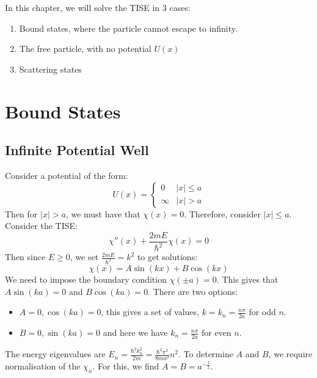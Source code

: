 \documentclass[../Main.tex]{subfiles}
\begin{document}
In this chapter, we will solve the TISE in 3 cases:
\begin{enumerate}
    \item Bound states, where the particle cannot escape to infinity.
    \item The free particle, with no potential $U(x)$
    \item Scattering states
\end{enumerate}
\section{Bound States}
\subsection{Infinite Potential Well}
Consider a potential of the form:
\begin{equation*}
    U(x) =
    \begin{cases}
        0 & |x| \leq a \\
        \infty & |x| > a
    \end{cases}
\end{equation*}
Then for $|x| > a$, we must have that $\chi(x) = 0$. Therefore, consider $|x| \leq a$. Consider the TISE:
\begin{equation*}
    \chi''(x) + \frac{2mE}{\hbar^2} \chi(x) = 0
\end{equation*}
Then since $E \geq 0$, we set $\frac{2mE}{\hbar^2} = k^2$ to get solutions:
\begin{equation*}
    \chi(x) = A\sin(kx) + B\cos(kx)
\end{equation*}
We need to impose the boundary condition $\chi(\pm a) = 0$. This gives that $A\sin(ka) = 0$ and $B\cos(ka) = 0$. There are two options:
\begin{itemize}
    \item $A = 0, \cos(ka) = 0$, this gives a set of values, $k = k_n = \frac{n\pi}{2a}$ for odd $n$.
    \item $B = 0, \sin(ka) = 0$ and here we have $k_n = \frac{n\pi}{2a}$ for even $n$.
\end{itemize}
The energy eigenvalues are $E_n = \frac{\hbar^2 k_n^2}{2m} = \frac{\hbar^2 \pi^2}{8ma^2}n^2$. To determine $A$ and $B$, we require normalisation of the $\chi_n$. For this, we find $A = B = a^{-\frac12}$.
\end{document}
